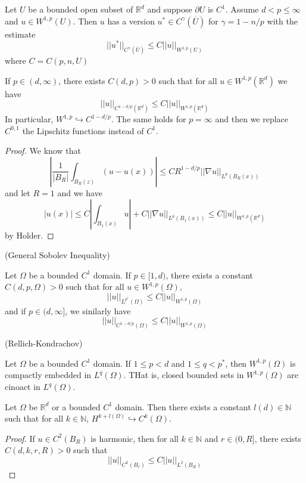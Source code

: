 \begin{theorem}
    Let $U$ be a bounded open subset of $\mathbb{R}^d$ and suppose $\partial U$ is $C^1$. Assume $d < p \leq \infty$ and $u\in W^{1,p}(U)$. Then $u$ has a version $u^* \in C^{\gamma}(\overline{U})$ for $\gamma = 1 - n/p$ with the estimate
    \[
    ||u^*||_{C^{\gamma}(\overline{U})} \leq C||u||_{W^{1,p}(U)}
    \]
    where $C = C(p,n,U)$
\end{theorem}

\begin{corollary}
    If $p\in(d,\infty)$, there exists $C(d,p) > 0$ such that for all $u\in W^{1,p}(\mathbb{R}^d)$ we have
    \[
    ||u||_{C^{1-d/p}(\mathbb{R}^d)} \leq C||u||_{W^{1,p}(\mathbb{R}^d)}
    \]
    In particular, $W^{1,p} \hookrightarrow C^{1-d/p}$. The same holds for $p = \infty$ and then we replace $C^{0,1}$ the Lipschitz functions instead of $C^1$.
\end{corollary}
\begin{proof}
    We know that
    \[
    \left|\dfrac{1}{| B_R|}\int_{ B_R(z)}(u-u(x))\right| \leq CR^{1-d/p}||\nabla u||_{L^p(B_R(x))}
    \]
    and let $R=1$ and we have
    \[
    |u(x)|\leq C|\int_{B_1(x)} u| + C ||\nabla u||_{L^p(B_1(x))} \leq C ||u||_{W^{1,p}(\mathbb{R}^d)}
    \]
    by Holder.
\end{proof}

\begin{proposition}
    (General Sobolev Inequality)\par
    Let $\Omega$ be a bounded $C^1$ domain. If $p\in[1,d)$, there exists a constant $C(d,p,\Omega) > 0$ such that for all $u\in W^{1,p}(\Omega)$,
    \[
    ||u||_{L^{p^*}(\Omega)} \leq C||u||_{W^{1,p}(\Omega)}
    \]
    and if $p\in(d,\infty]$, we sinilarly have
    \[
    ||u||_{C^{1-d/p}(\Omega)} \leq C||u||_{W^{1,p}(\Omega)}
    \]
\end{proposition}

\begin{theorem}
    (Rellich-Kondrachov)\par
    Let $\Omega$ be a bounded $C^1$ domain. If $1\leq p < d$ and $1\leq q < p^*$, then $W^{1,p}(\Omega)$ is compactly embedded in $L^q(\Omega)$. THat is, closed bounded sets in $W^{1,p}(\Omega)$ are cinoact in $L^q(\Omega)$.
\end{theorem}

\begin{corollary}
    Let $\Omega$ be $\mathbb{R}^d$ or a bounded $C^1$ domain. Then there exists a constant $l(d) \in \mathbb{N}$ such that for all $k\in \mathbb{N}$, $H^{k+l(\Omega)} \hookrightarrow C^k(\Omega)$. 
\end{corollary}

\begin{proof}
    If $u\in C^2(B_R)$ is harmonic, then for all $k\in\mathbb{N}$ and $r\in (0,R]$, there exists $C(d,k,r,R)>0$ such that
    \[
    ||u||_{C^k(B_r)} \leq C||u||_{L^2(B_R)}
    \]
\end{proof}